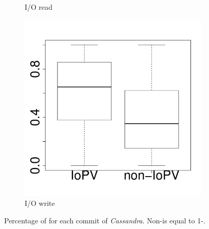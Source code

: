 \begin{figure}[t]
\begin{subfigure}{0.19\textwidth}
                \caption{I/O read}
        \end{subfigure}
        \begin{subfigure}{0.19\textwidth}
                \includegraphics[width=\linewidth]{Figures/iowrite-cassandra-boxplot.pdf}
                \caption{I/O write}
        \end{subfigure}
        
	\caption{Percentage of \inconsistent for each commit of \emph{Cassandra}.  Non-\inconsistent is equal to 1-\inconsistent.} %
	\label{fig:iopv_per_commit_cassandra}
\end{figure}


